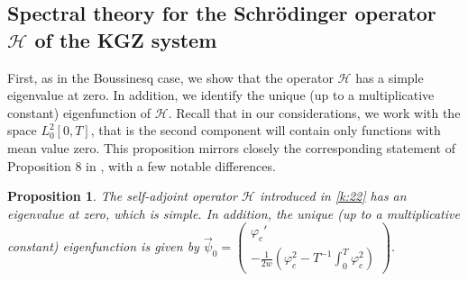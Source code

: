 \documentclass[final,11pt,leqno]{amsart}
\newtheorem{proposition}{Proposition}
\begin{document}
\subsection{Spectral theory for the Schr\"odinger operator ${\mathcal H}$ of the KGZ system}
\label{sec:3.3}
First, as in the Boussinesq case, we show that the operator ${\mathcal H}$ has a simple eigenvalue at zero. In addition, we identify the unique
(up to a multiplicative constant) eigenfunction of ${\mathcal H}$. Recall that in our considerations, we work with the space $L^2_0[0,T]$,
that is the second component will contain only functions with mean value zero. This proposition mirrors closely the corresponding statement
of Proposition 8 in \cite{SS1}, with a few notable differences.
\begin{proposition}
\label{prop:k1}
The self-adjoint operator ${\mathcal H}$ introduced in \eqref{k:22} has an eigenvalue at zero, which is simple. In addition, the unique (up to a multiplicative constant)
eigenfunction    is given by
$\vec{\psi}_0=\left(\begin{array}{c} {\varphi}_c' \\
-{\frac{{1}}{{2w}}}\left({\varphi}_c^2-T^{-1}\int_0^T {\varphi}_c^2\right)
\end{array}\right)$.
\end{proposition}
\end{document}
